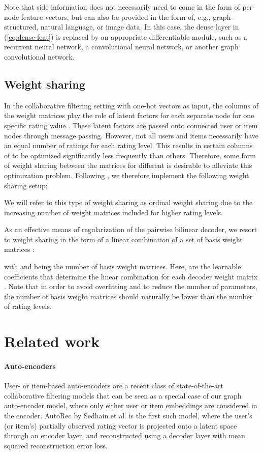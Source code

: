 \documentclass[twoside]{article}
\begin{document}
Note that side information does not necessarily need to come in the form of per-node feature vectors, but can also be provided in the form of, e.g., graph-structured, natural language, or image data. In this case, the dense layer in (\ref{eq:dense-feat}) is replaced by an appropriate differentiable module, such as a recurrent neural network, a convolutional neural network, or another graph convolutional network.

\subsection{Weight sharing}
\label{sec:ord}
In the collaborative filtering setting with one-hot vectors as input, the columns of the weight matrices  play the role of latent factors for each separate node for one specific rating value . These latent factors are passed onto connected user or item nodes through message passing.
However, not all users and items necessarily have an equal number of ratings for each rating level. 
This results in certain columns of  to be optimized significantly less frequently than others. Therefore, some form of weight sharing between the matrices  for different  is desirable to alleviate this optimization problem. 
Following \cite{zheng2016neural}, we therefore implement the following weight sharing setup:

We will refer to this type of weight sharing as ordinal weight sharing due to the increasing number of weight matrices included for higher rating levels. 

As an effective means of regularization of the pairwise bilinear decoder, we resort to weight sharing in the form of a linear combination of a set of basis weight matrices :

with  and  being the number of basis weight matrices. Here,  are the learnable coefficients that determine the linear combination for each decoder weight matrix . Note that in order to avoid overfitting and to reduce the number of parameters, the number of basis weight matrices  should naturally be lower than the number of rating levels.  
\section{Related work}
\label{sec:rel}
\paragraph{Auto-encoders} User- or item-based auto-encoders \cite{sedhain2015autorec, zheng2016neural,strub2016hybrid} are a recent class of state-of-the-art collaborative filtering models that can be seen as a special case of our graph auto-encoder model, where only either user or item embeddings are considered in the encoder. AutoRec by Sedhain et al. \cite{sedhain2015autorec} is the first such model, where the user's (or item's) partially observed rating vector is projected onto a latent space through an encoder layer, and reconstructed using a decoder layer with mean squared reconstruction error loss. 
\end{document}
